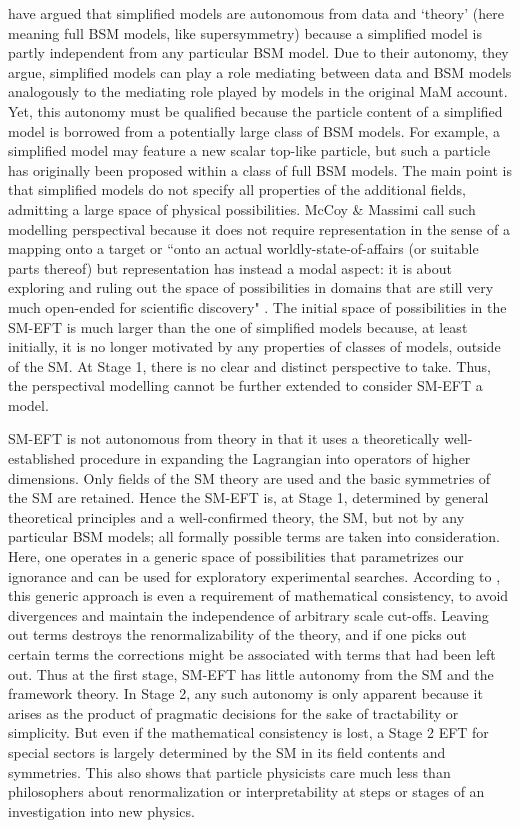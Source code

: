 \citet{mccoymassimi} have argued that simplified models are autonomous from data and `theory' (here meaning full BSM models, like supersymmetry) because a simplified model is partly independent from any particular BSM model. 
Due to their autonomy, they argue, simplified models can play a role mediating between data and BSM models analogously to the mediating role played by models in the original MaM account. 
Yet, this autonomy must be qualified because the particle content of a simplified model is borrowed from a potentially large class of BSM models. 
For example, a simplified model may feature a new scalar top-like particle, but such a particle has originally been proposed within a class of full BSM models. 
The main point is that simplified models do not specify all properties of the additional fields, admitting a large space of physical possibilities.
McCoy \& Massimi call such modelling perspectival because it does not require representation in the sense of a mapping onto a target or ``onto an actual worldly-state-of-affairs (or suitable parts thereof) but representation has instead a modal aspect: it is about exploring and ruling out the space of possibilities in domains that are still very much open-ended for scientific discovery" \citep[p.~338]{mccoymassimi}.
The initial space of possibilities in the SM-EFT is much larger than the one of simplified models because, at least initially, it is no longer motivated by any properties of classes of models, outside of the SM. 
At Stage 1, there is no clear and distinct perspective to take. 
Thus, the perspectival modelling cannot be further extended to consider SM-EFT a model.

SM-EFT is not autonomous from theory in that it uses a theoretically well-established procedure in expanding the Lagrangian into operators of higher dimensions. 
Only fields of the SM theory are used and the basic symmetries of the SM are retained. 
Hence the SM-EFT is, at Stage 1, determined by general theoretical principles and a well-confirmed theory, the SM, but not by any particular BSM models; all formally possible terms are taken into consideration.  
Here, one operates in a generic space of possibilities that parametrizes our ignorance and can be used for exploratory experimental searches. 
According to \cite{wells2011}, this generic approach is even a requirement of mathematical consistency, to avoid divergences and maintain the independence of arbitrary scale cut-offs. 
Leaving out terms destroys the renormalizability of the theory, and if one picks out certain terms the corrections might be associated with terms that had been left out. 
Thus at the first stage, SM-EFT has little autonomy from the SM and the framework theory. 
In Stage 2, any such autonomy is only apparent because it arises as the product of pragmatic decisions for the sake of tractability or simplicity.
But even if the mathematical consistency is lost, a Stage 2 EFT for special sectors is largely determined by the SM in its field contents and symmetries. This also shows that particle physicists care much less than philosophers about renormalization or interpretability at steps or stages of an investigation into new physics.


